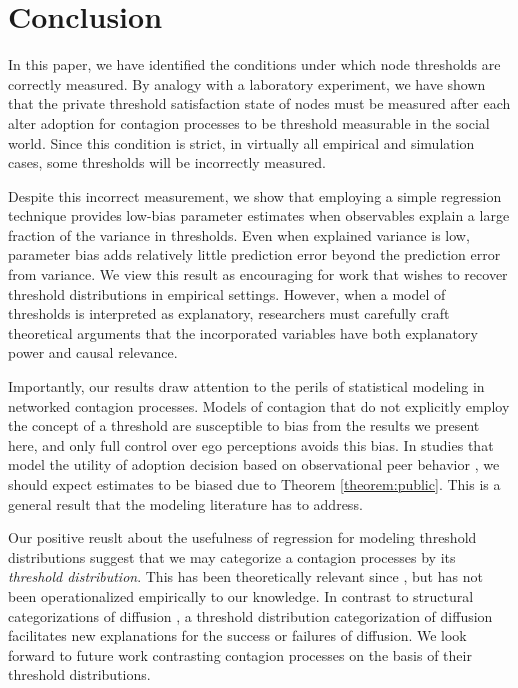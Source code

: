 \documentclass[a4paper]{article}
\begin{document}
\section{Conclusion}

In this paper, we have identified the conditions under which node thresholds are correctly measured. By analogy with a laboratory experiment, we have shown that the private threshold satisfaction state of nodes must be measured after each alter adoption for contagion processes to be threshold measurable in the social world. Since this condition is strict, in virtually all empirical and simulation cases, some thresholds will be incorrectly measured.

Despite this incorrect measurement, we show that employing a simple regression technique provides low-bias parameter estimates when observables explain a large fraction of the variance in thresholds. Even when explained variance is low, parameter bias adds relatively little prediction error beyond the prediction error from variance. We view this result as encouraging for work that wishes to recover threshold distributions in empirical settings. However, when a model of thresholds is interpreted as explanatory, researchers must carefully craft theoretical arguments that the incorporated variables have both explanatory power and causal relevance.

Importantly, our results draw attention to the perils of statistical modeling in networked contagion processes. Models of contagion that do not explicitly employ the concept of a threshold are susceptible to bias from the results we present here, and only full control over ego perceptions avoids this bias. In studies that model the utility of adoption decision based on observational peer behavior \parencite{econ stuff, christakis}, we should expect estimates to be biased due to Theorem \ref{theorem:public}. This is a general result that the modeling literature has to address.

Our positive reuslt about the usefulness of regression for modeling threshold distributions suggest that we may categorize a contagion processes by its \emph{threshold distribution}. This has been theoretically relevant since \cite{Granovetter1978}, but has not been operationalized empirically to our knowledge. In contrast to structural categorizations of diffusion \parencite{Goel2012}, a threshold distribution categorization of diffusion facilitates new explanations for the success or failures of diffusion. We look forward to future work contrasting contagion processes on the basis of their threshold distributions.
\end{document}
